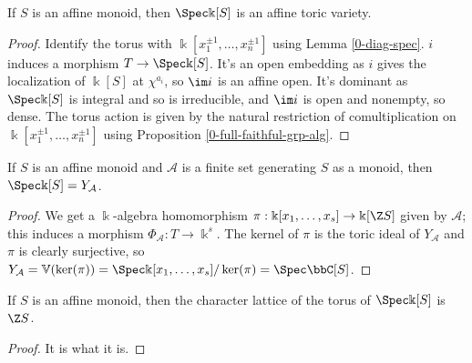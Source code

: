 \begin{proposition}
  \label{1-1-14-aff-tor-var-spec-aff-mon-alg}
  \leanok

  If $S$ is an affine monoid, then $\Spec \Bbbk[S]$ is an affine toric variety.
\end{proposition}
\begin{proof}

  Identify the torus with $\Bbbk[x_1^{\pm1}, \dotsc, x_n^{\pm1}]$ using Lemma \ref{0-diag-spec}.
  $i$ induces a morphism $T \to \Spec \Bbbk[S]$. It's an open embedding as $i$ gives the localization of $\Bbbk[S]$ at $\chi^{a_i}$, so $\im i$ is an affine open. It's dominant as $\Spec \Bbbk[S]$ is integral and so is irreducible, and $\im i$ is open and nonempty, so dense. The torus action is given by the natural restriction of comultiplication on $\Bbbk[x_1^{\pm1}, \dotsc, x_n^{\pm1}]$ using Proposition \ref{0-full-faithful-grp-alg}.
\end{proof}


\begin{proposition}
  \label{1-1-14-spec-aff-mon-alg-eq-ya}

  If $S$ is an affine monoid and $\mathcal A$ is a finite set generating $S$ as a monoid, then $\Spec \Bbbk[S] = Y_{\mathcal A}$.
\end{proposition}
\begin{proof}

  We get a $\Bbbk$-algebra homomorphism $\pi : \Bbbk[x_1, \dotsc, x_s] \to \Bbbk[\Z S]$ given by $\mathcal A$; this induces a morphism $\Phi_{\mathcal A} : T \to \Bbbk^s$. The kernel of $\pi$ is the toric ideal of $Y_{\mathcal A}$ and $\pi$ is clearly surjective, so $Y_{\mathcal A} = \mathbb V(\ker(\pi)) = \Spec \Bbbk[x_1, \dotsc, x_s] / \ker(\pi) = \Spec \bbC[S]$.
\end{proof}


\begin{proposition}
  \label{1-1-14-char-spec-aff-mon-alg}

  If $S$ is an affine monoid, then the character lattice of the torus of $\Spec \Bbbk[S]$ is $\Z S$.
\end{proposition}
\begin{proof}

  It is what it is.
\end{proof}


